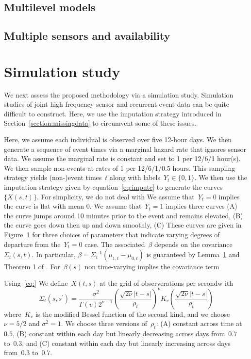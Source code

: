 \documentclass[12pt]{amsart}
\begin{document}
\newpage

\subsection{Multilevel models}

\subsection{Multiple sensors and availability}

\section{Simulation study}

We next assess the proposed methodology via a simulation study.
Simulation studies of joint high frequency sensor and recurrent
event data can be quite difficult to construct.  Here, we use the
imputation strategy introduced in Section~\ref{section:missingdata} to
circumvent some of these issues.  

Here, we assume each individual is observed over five 12-hour days.  
We then generate a sequence of event times via a marginal hazard
rate that ignores sensor data.  We assume the marginal rate is
constant and set to 1 per 12/6/1 hour(s). We then sample non-events at
rates of 1 per 12/6/1/0.5 hours.
This sampling strategy yields (non-)event times~$t$ along with
labels~$Y_t \in \{0,1\}$. 
We then use the imputation strategy given by
equation~\eqref{eq:impute} to generate the curves~$\{ X(s,t) \}$.
For simplicity, we do not deal with 
We assume that~$Y_t = 0$ implies the curve is flat with mean 0.
We assume that~$Y_t = 1$ implies three curves (A) the curve jumps
around 10 minutes prior to the event and remains elevated, (B) the
curve goes down then up and down smoothly, (C) 
These curves are given in Figure~\ref{} for three choices of
parameters that indicate varying degrees of departure from the~$Y_t =
0$ case.
The associated~$\beta$ depends on the covariance~$\Sigma_t (s,t)$.
In particular, $\beta = \Sigma_t^{-1} (\mu_{1,t} - \mu_{0,t})$ is
guaranteed by Lemma~\ref{} and Theorem 1 of \cite{Petrovich2018}.
For~$\beta(s)$ non time-varying implies the covariance term 

Using~\eqref{eq:}
We define~$X(t,s)$ at the grid of observerations per secondw ith
\[
  \Sigma_t (s, s^\prime) = 
  \frac{\sigma^2}{\Gamma (v) 2^{\nu-1}} 
  \left( \frac{\sqrt{2 \nu} |t-s|}{\rho_t} \right)^{\nu}
  K_v \left( \frac{\sqrt{2 \nu} |t-s|}{\rho_t} \right)
\]
where~$K_v$ is the modified Bessel function of the second kind, and
we choose~$\nu = 5/2$ and $\sigma^2 = 1$. 
We choose three versions of~$\rho_t$: (A) constant across time
at $0.5$, (B) constant within each day but linearly decreasing
across days from~$0.7$ to~$0.3$, and (C) constant within each day but
linearly increasing across days from~$0.3$ to~$0.7$.
\end{document}
